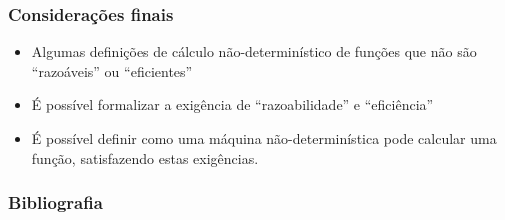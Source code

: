 \documentclass[utf8,notheorems]{beamer}
\theoremstyle{definition}
\begin{document}
\begin{frame}
    \frametitle{Considerações finais}
    \begin{itemize}
        \item Algumas definições de cálculo não-determinístico de funções
            que não são ``razoáveis'' ou ``eficientes''
        \item É possível formalizar a exigência de ``razoabilidade''
            e ``eficiência''
        \item É possível definir como uma máquina não-determinística
            pode calcular uma função, satisfazendo estas exigências.
    \end{itemize}
\end{frame}

\begin{frame}[allowframebreaks]
    \frametitle{Bibliografia}
    
    
\end{frame}

\begin{frame}
    \titlepage
\end{frame}
\end{document}
